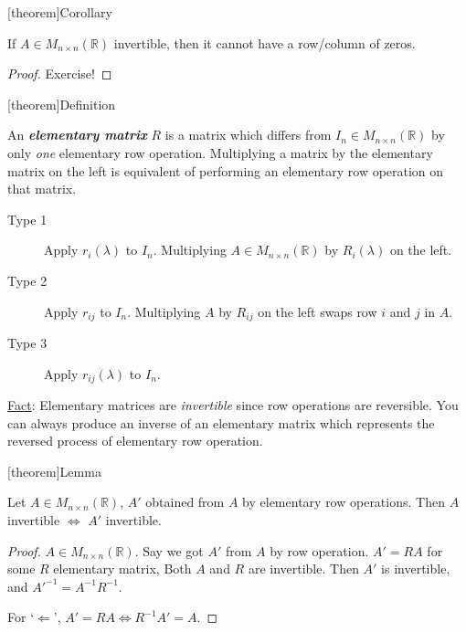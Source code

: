 \documentclass[12pt]{report}
\theoremstyle{definition}
\begin{document}
[theorem]{Corollary}
\begin{invertible so row/column of zero}
    If $A \in M_{n\times n}(\mathbb{R})$ invertible, then it cannot have a row/column of zeros.
\end{invertible so row/column of zero}

\begin{proof}
    Exercise!
\end{proof}

[theorem]{Definition}
\begin{elementary matrix}
    An \textbf{\emph{elementary matrix}} $R$ is a matrix which differs from $I_n \in M_{n \times n}(\mathbb{R})$
    by only \emph{one} elementary row operation.
    Multiplying a matrix by the elementary matrix on the left is equivalent of performing an
    elementary row operation on that matrix.
\end{elementary matrix}

\begin{description}
    \item[Type 1] Apply $r_i(\lambda)$ to $I_n$.
        Multiplying $A \in M_{n\times n}(\mathbb{R})$ by $R_i(\lambda)$
        on the left.
        
    \item[Type 2] Apply $r_{ij}$ to $I_n$.
        Multiplying $A$ by $R_{ij}$ on the left swaps row $i$ and $j$ in $A$.

    \item[Type 3] Apply $r_{ij}(\lambda)$ to $I_n$.
\end{description}

\underline{Fact}: Elementary matrices are \emph{invertible} since row operations are reversible.
You can always produce an inverse of an elementary matrix which represents the reversed
process of elementary row operation.

[theorem]{Lemma}
\begin{elementary row operations are invertible}
    Let $A \in M_{n\times n}(\mathbb{R})$, $A'$ obtained from $A$
    by elementary row operations.
    Then $A$ invertible $\iff$ $A'$ invertible.
\end{elementary row operations are invertible}

\begin{proof}
    $A \in M_{n\times n}(\mathbb{R})$. Say we got $A'$ from $A$ by row operation.
    $A' = RA$ for some $R$ elementary matrix, Both $A$ and $R$ are invertible.
    Then $A'$ is invertible, and $A'^{-1} = A^{-1}R^{-1}$.

    For `$\Leftarrow$', $A' = RA \iff R^{-1}A' = A$.
\end{proof}
\end{document}

